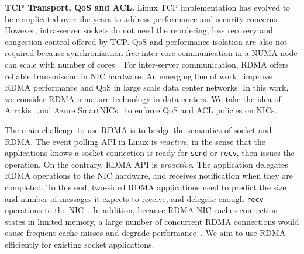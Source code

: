 
\textbf{TCP Transport, QoS and ACL.}
Linux TCP implementation has evolved to be complicated over the years to address performance and security concerns~\cite{yasukata2016stackmap}. However, intra-server sockets do not need the reordering, loss recovery and congestion control offered by TCP. QoS and performance isolation are also not required because synchronization-free inter-core communication in a NUMA node can scale with number of cores~\cite{intel-manual}. For inter-server communication, RDMA offers reliable transmission in NIC hardware. An emerging line of work~\cite{zhu2015congestion,guo2016rdma,lu2017memory,mprdma} improve RDMA performance and QoS in large scale data center networks. In this work, we consider RDMA a mature technology in data centers. We take the idea of Arrakis~\cite{peter2016arrakis} and Azure SmartNICs~\cite{smartnic} to enforce QoS and ACL policies on NICs.

The main challenge to use RDMA is to bridge the semantics of socket and RDMA. The event polling API in Linux is \textit{reactive}, in the sense that the applications knows a socket connection is ready for \texttt{send} or \texttt{recv}, then issues the operation.
On the contrary, RDMA API is \textit{proactive}. The application delegates RDMA operations to the NIC hardware, and receives notification when they are completed.
To this end, two-sided RDMA applications need to predict the size and number of messages it expects to receive, and delegate enough \texttt{recv} operations to the NIC~\cite{huang2017high}.
In addition, because RDMA NIC caches connection states in limited memory, a large number of concurrent RDMA connections would cause frequent cache misses and degrade performance~\cite{mprdma,kaminsky2016design}.
We aim to use RDMA efficiently for existing socket applications.
